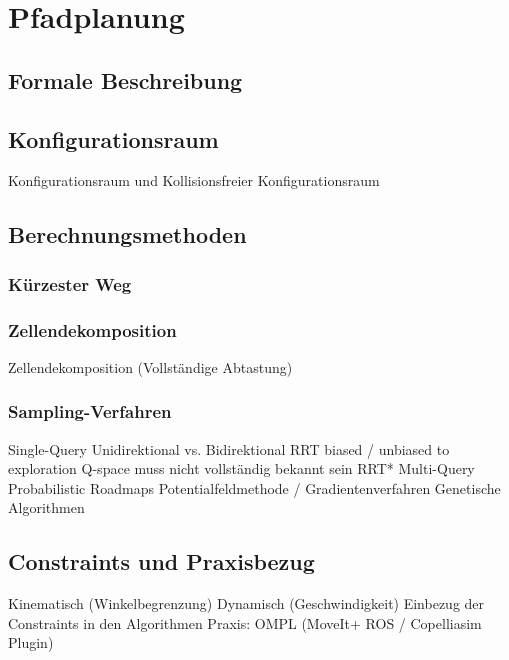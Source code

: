 \cleardoublepage
\chapter{Pfadplanung}

\section{Formale Beschreibung}

\section{Konfigurationsraum}

Konfigurationsraum und Kollisionsfreier Konfigurationsraum

\section{Berechnungsmethoden}

\subsection{Kürzester Weg}

\subsection{Zellendekomposition}
Zellendekomposition (Vollständige Abtastung)

\subsection{Sampling-Verfahren}
Single-Query
Unidirektional vs. Bidirektional
RRT
biased / unbiased to exploration
Q-space muss nicht vollständig bekannt sein
RRT*
Multi-Query
Probabilistic Roadmaps
Potentialfeldmethode / Gradientenverfahren
Genetische Algorithmen

\section{Constraints und Praxisbezug}
Kinematisch (Winkelbegrenzung)
Dynamisch (Geschwindigkeit)
Einbezug der Constraints in den Algorithmen
Praxis: OMPL (MoveIt+ ROS / Copelliasim Plugin)

